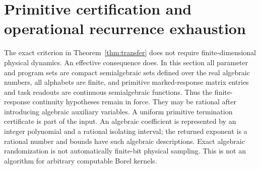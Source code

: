\section{Primitive certification and operational recurrence exhaustion}\label{sec:algebraic}
The exact criterion in Theorem~\ref{thm:transfer} does not require finite-dimensional physical dynamics. An effective consequence does. In this section all parameter and program sets are compact semialgebraic sets defined over the real algebraic numbers, all alphabets are finite, and primitive marked-response matrix entries and task readouts are continuous semialgebraic functions. Thus the finite-response continuity hypotheses remain in force. They may be rational after introducing algebraic auxiliary variables. A uniform primitive termination certificate is part of the input. An algebraic coefficient is represented by an integer polynomial and a rational isolating interval; the returned exponent is a rational number and bounds have such algebraic descriptions. Exact algebraic randomization is not automatically finite-bit physical sampling. This is not an algorithm for arbitrary computable Borel kernels.

